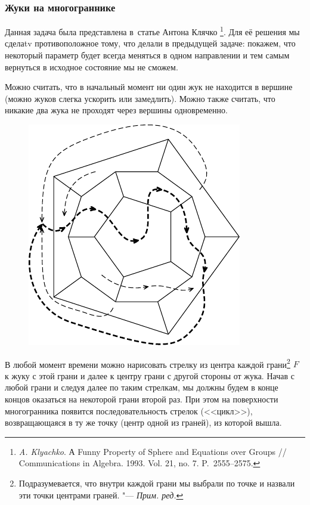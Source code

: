 \documentclass[twoside]{book}
\begin{document}
\subsubsection*{Жуки на многограннике}%

Данная задача была представлена в~статье Антона Клячко%
\footnote{\emph{A. Klyachko}. А Funny Property of Sphere and Equations over Groups /\!/ Com\-mu\-ni\-ca\-tions in Algebra. 1993. Vol. 21, no. 7. P.~2555--2575.}. 
Для её решения мы сделаtv противоположное тому, что делали в
предыдущей задаче: покажем, что некоторый параметр будет всегда
меняться в одном направлении и тем самым вернуться в исходное состояние мы не сможем.

\medskip

Можно считать, что в начальный момент ни один жук не находится в вершине (можно жуков слегка ускорить или замедлить).
Можно также считать, что никакие два жука не проходят через вершины одновременно.

\begin{figure}[!ht]
\centering
\includegraphics{mp/wink-22}
\end{figure}

В любой момент времени можно нарисовать стрелку из центра каждой
грани\footnote{Подразумевается, что внутри каждой грани мы выбрали по точке и назвали эти точки центрами граней. "--- \emph{Прим. ред.}} $F$ к жуку с этой грани и далее к центру грани с другой стороны от жука.
Начав с любой грани и следуя далее по таким стрелкам, мы должны будем
в конце концов оказаться на некоторой грани второй раз. При этом на
поверхности многогранника появится последовательность стрелок
(<<цикл>>), возвращающаяся в ту же точку (центр одной из граней), из
которой вышла.
\end{document}
